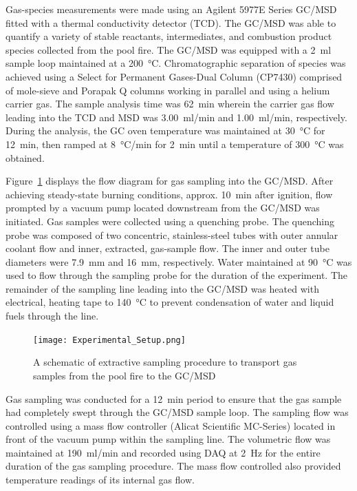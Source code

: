 \documentclass[12pt]{article}
\begin{document}
Gas-species measurements were made using an Agilent 5977E Series GC/MSD fitted with a thermal conductivity detector (TCD). The GC/MSD was able to quantify a variety of stable reactants, intermediates, and combustion product species collected from the pool fire. The GC/MSD was equipped with a 2~\si{ml} sample loop maintained at a 200~°\si{C}. Chromatographic separation of species was achieved using a Select for Permanent Gases-Dual Column (CP7430) comprised of mole-sieve and Porapak Q columns working in parallel and using a helium carrier gas. The sample analysis time was 62~\si{min} wherein the carrier gas flow leading into the TCD and MSD was 3.00~\si{ml/min} and 1.00~\si{ml/min}, respectively. During the analysis, the GC oven temperature was maintained at 30~°\si{C} for 12~\si{min}, then ramped at 8~°\si{C}/\si{min} for 2~\si{min} until a temperature of 300~°\si{C} was obtained.

Figure~\ref{fig:Experimental_Setup} displays the flow diagram for gas sampling into the GC/MSD. After achieving steady-state burning conditions, approx. 10~\si{min} after ignition, flow prompted by a vacuum pump located downstream from the GC/MSD was initiated. Gas samples were collected using a quenching probe. The quenching probe was composed of two concentric, stainless-steel tubes with outer annular coolant flow and inner, extracted, gas-sample flow. The inner and outer tube diameters were 7.9~\si{mm} and 16~\si{mm}, respectively. Water maintained at 90~°\si{C} was used to flow through the sampling probe for the duration of the experiment. The remainder of the sampling line leading into the GC/MSD was heated with electrical, heating tape to 140~°\si{C} to prevent condensation of water and liquid fuels through the line.

\begin{figure}
	\centering
\texttt{[image: Experimental\_Setup.png]}
	\caption[A schematic of gas sampling procedure]{A schematic of extractive sampling procedure to transport gas samples from the pool fire to the GC/MSD}
	\label{fig:Experimental_Setup}
\end{figure}

Gas sampling was conducted for a 12~\si{min} period to ensure that the gas sample had completely swept through the GC/MSD sample loop. The sampling flow was controlled using a mass flow controller (Alicat Scientific MC-Series) located in front of the vacuum pump within the sampling line. The volumetric flow was maintained at 190~\si{ml/min} and recorded using DAQ at 2~\si{Hz} for the entire duration of the gas sampling procedure. The mass flow controlled also provided temperature readings of its internal gas flow.
\end{document}
